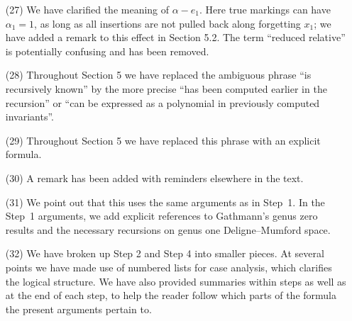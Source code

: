 \documentclass[11pt]{amsart}
\theoremstyle{plain}
\theoremstyle{remark}
\theoremstyle{definition}
\begin{document}
\begin{enumerate}
\item[(27)] We have clarified the meaning of $\alpha-e_1$. Here true markings can have $\alpha_1=1$, as long as all insertions are not pulled back along forgetting $x_1$; we have added a remark to this effect in Section 5.2. The term ``reduced relative'' is potentially confusing and has been removed.
\item[(28)] Throughout Section 5 we have replaced the ambiguous phrase ``is recursively known'' by the more precise ``has been computed earlier in the recursion'' or ``can be expressed as a polynomial in previously computed invariants''.
\item[(29)] Throughout Section 5 we have replaced this phrase with an explicit formula.
\item[(30)] A remark has been added with reminders elsewhere in the text.
\item[(31)] We point out that this uses the same arguments as in Step~1. In the Step~1 arguments, we add explicit references to Gathmann's genus zero results and the necessary recursions on genus one Deligne--Mumford space.
\item[(32)] We have broken up Step 2 and Step 4 into smaller pieces. At several points we have made use of numbered lists for case analysis, which clarifies the logical structure. We have also provided summaries within steps as well as at the end of each step, to help the reader follow which parts of the formula the present arguments pertain to.
\end{enumerate}


\end{document}
